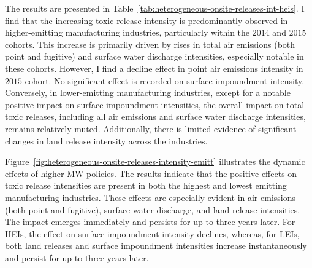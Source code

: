 \documentclass[numsec,webpdf,contemporary,large,namedate]{oup-authoring-template}%
\begin{document}
    The results are presented in Table~\ref{tab:heterogeneous-onsite-releases-int-heis}. I find that the increasing toxic release intensity is predominantly observed in higher-emitting manufacturing industries, particularly within the $2014$ and $2015$ cohorts. This increase is primarily driven by rises in total air emissions (both point and fugitive) and surface water discharge intensities, especially notable in these cohorts. However, I find a decline effect in point air emissions intensity in $2015$ cohort. No significant effect is recorded on surface impoundment intensity. Conversely, in lower-emitting manufacturing industries, except for a notable positive impact on surface impoundment intensities, the overall impact on total toxic releases, including all air emissions and surface water discharge intensities, remains relatively muted. Additionally, there is limited evidence of significant changes in land release intensity across the industries.
    

    Figure~\ref{fig:heterogeneous-onsite-releases-intensity-emitt} illustrates the dynamic effects of higher MW policies. The results indicate that the positive effects on toxic release intensities are present in both the highest and lowest emitting manufacturing industries. These effects are especially evident in air emissions (both point and fugitive), surface water discharge, and land release intensities. The impact emerges immediately and persists for up to three years later. For HEIs, the effect on surface impoundment intensity declines, whereas, for LEIs, both land releases and surface impoundment intensities increase instantaneously and persist for up to three years later.
\end{document}
